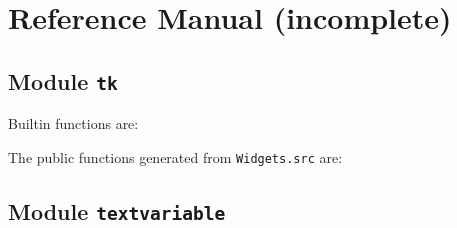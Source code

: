 \chapter{Reference Manual (incomplete)}
\label{chap:ref}
\section*{Module {\tt tk}}
Builtin functions are:
\begin{alltt}

\end{alltt}

\noindent
The public functions generated from {\tt Widgets.src} are:
\begin{alltt}

\end{alltt}



\section*{Module {\tt textvariable}}
\begin{alltt}

\end{alltt}

